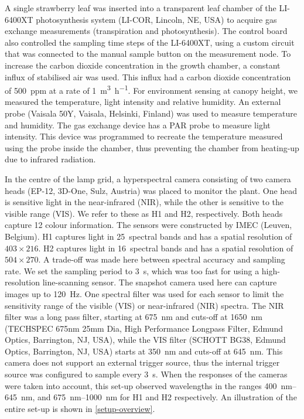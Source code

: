         A single strawberry leaf was inserted into a transparent leaf chamber of the LI-6400XT photosynthesis system (LI-COR, Lincoln, NE, USA) to acquire gas exchange measurements (transpiration and photosynthesis). The control board also controlled the sampling time steps of the LI-6400XT, using a custom circuit that was connected to the manual sample button on the measurement node. To increase the carbon dioxide concentration in the growth chamber, a constant influx of stabilised air was used. This influx had a carbon dioxide concentration of \SI{500}{ppm} at a rate of \SI{1}{\cubic\metre \per\hour}. For environment sensing at canopy height, we measured the temperature, light intensity and relative humidity. An external probe (Vaisala 50Y, Vaisala, Helsinki, Finland) was used to measure temperature and humidity. The gas exchange device has a PAR probe to measure light intensity. This device was programmed to recreate the temperature measured using the probe inside the chamber, thus preventing the chamber from heating-up due to infrared radiation.
        
        In the centre of the lamp grid, a hyperspectral camera consisting of two camera heads (EP-12, {3D-One}, Sulz, Austria) was placed to monitor the plant. One head is sensitive light in the near-infrared (NIR), while the other is sensitive to the visible range (VIS). We refer to these as H1 and H2, respectively. Both heads capture \SI{12}{\bit} colour information. The sensors were constructed by IMEC (Leuven, Belgium).
        H1 captures light in 25~spectral bands and has a spatial resolution of $403 \times 216$. H2 captures light in 16~spectral bands and has a spatial resolution of $504 \times 270$. A trade-off was made here between spectral accuracy and sampling rate. We set the sampling period to \SI{3}{\second}, which was too fast for using a high-resolution line-scanning sensor. The snapshot camera used here can capture images up to \SI{120}{\hertz}. 
        One spectral filter was used for each sensor to limit the sensitivity range of the visible (VIS) or near-infrared (NIR) spectra. The NIR filter was a long pass filter, starting at \SI{675}{\nano\metre} and cuts-off at \SI{1650}{\nano\metre} (TECHSPEC 675nm 25mm Dia, High Performance Longpass Filter, Edmund Optics, Barrington, NJ, USA), while the VIS filter (SCHOTT BG38, Edmund Optics, Barrington, NJ, USA) starts at \SI{350}{\nano\metre} and cuts-off at \SI{645}{\nano\metre}. This camera does not support an external trigger source, thus the internal trigger source was configured to sample every \SI{3}{\second}. When the responses of the cameras were taken into account, this set-up observed wavelengths in the ranges \SIrange{400}{645}{\nano\metre}, and \SIrange{675}{1000}{\nano\metre} for H1 and H2 respectively. %
        An illustration of the entire set-up is shown in \cref{setup-overview}.
        

